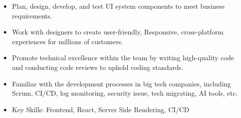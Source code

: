 \documentclass[10pt,a4paper,ragged2e]{altacv}
\begin{document}

\begin{fullwidth}
\makecvheader
\end{fullwidth}





\begin{itemize}
\item Plan, design, develop, and test UI system components to meet business requirements.
\item Work with designers to create user-friendly, Responsive, cross-platform experiences for millions of customers.
\item Promote technical excellence within the team by writing high-quality code and conducting code reviews to uphold coding standards.
\item Familiar with the development processes in big tech companies,  including Scrum, CI/CD, log monitoring, security issue, tech migrating, AI tools, etc.
\item Key Skills: Frontend, React, Server Side Rendering, CI/CD
\end{itemize}
\divider
\end{document}
